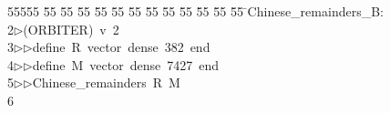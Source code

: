 %
%
\begin{tabbing}
55555 \= 55 \= 55 \= 55 \= 55 \= 55 \= 55 \= 55 \= 55 \= 55 \= 55 \= 55 \= 55 \= \>Chinese\_remainders\_B:\\[0pt]
2\>$\triangleright$\>(ORBITER)\ v\ 2\ \\[0pt]
3\>$\triangleright$\>$\triangleright$\>define\ R\ vector\ dense\ 382\ end\ \\[0pt]
4\>$\triangleright$\>$\triangleright$\>define\ M\ vector\ dense\ 7427\ end\ \\[0pt]
5\>$\triangleright$\>$\triangleright$\>Chinese\_remainders\ R\ M\\[0pt]
6\>\end{tabbing}
